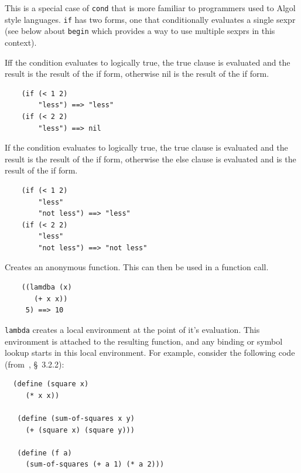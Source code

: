 \documentclass[12pt]{article}
\begin{document}

This is a special case of \verb|cond| that is more familiar to
programmers used to Algol style languages. \verb|if| has two forms,
one that conditionally evaluates a single sexpr (see below about
\verb|begin| which provides a way to use multiple sexprs in this context).

Iff the condition evaluates to logically true, the true clause is
evaluated and the result is the result of the if form, otherwise nil
is the result of the if form. 

\begin{verbatim}
    (if (< 1 2) 
        "less") ==> "less"
    (if (< 2 2) 
        "less") ==> nil
\end{verbatim}


If the condition evaluates to logically true, the true clause is
evaluated and the result is the result of the if form, otherwise the
else clause is evaluated and is the result of the if form. 

\begin{verbatim}
    (if (< 1 2) 
        "less" 
        "not less") ==> "less"
    (if (< 2 2) 
        "less" 
        "not less") ==> "not less"
\end{verbatim}


Creates an anonymous function. This can then be used in a function call.

\begin{verbatim}
    ((lamdba (x) 
       (+ x x)) 
     5) ==> 10
\end{verbatim}

\verb|lambda| creates a local environment at the point of it's
evaluation. This environment is attached to the resulting function,
and any binding or symbol lookup starts in this local environment. For
example, consider the following code (from~\cite{sicp}, \S~3.2.2):

\begin{verbatim}
  (define (square x)
     (* x x))

   (define (sum-of-squares x y)
     (+ (square x) (square y)))

   (define (f a)
     (sum-of-squares (+ a 1) (* a 2)))
\end{verbatim}
\end{document}
